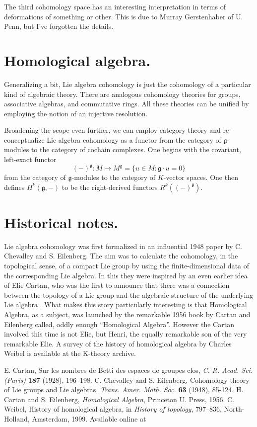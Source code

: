 \documentclass[12pt]{article}
\newcommand{\fg}{\mathfrak{g}}
\begin{document}
The third cohomology space has an interesting interpretation in terms
of deformations of something or other.  This is due to Murray
Gerstenhaber of U. Penn, but I've forgotten the details.

\section{Homological algebra.}
Generalizing a bit, Lie algebra cohomology is just the cohomology of a
particular kind of algebraic theory.  There are analogous cohomology
theories for groups, associative algebras, and commutative rings.  All
these theories can be unified by employing the notion of an injective
resolution.

Broadening the scope even further, we can employ category theory and
re-conceptualize Lie algebra cohomology as a functor from the category
of $\fg$-modules to the category of cochain complexes.  One begins with
the covariant, left-exact functor
\[ (-)^\fg: M\mapsto M^{\fg}=\{u\in M : \fg \cdot u=0 \}\] from
the category of $\fg$-modules to the category of $K$-vector spaces.
One then defines $H^k(\fg,-)$ to be the right-derived functors
$R^k((-)^{\fg})$.

\section{Historical notes.}
Lie algebra cohomology was first formalized in an influential 1948
paper by C. Chevalley and S. Eilenberg\cite{CE48}.  The aim was to
calculate the cohomology, in the topological sense, of a compact Lie
group by using the finite-dimensional data of the corresponding Lie
algebra.  In this they were inspired by an even earlier idea of Elie
Cartan, who was the first to announce that there was a connection
between the topology of a Lie group and the algebraic structure of the
underlying Lie algebra \cite{C28}.  What makes this story particularly
interesting is that Homological Algebra, as a subject, was launched by
the remarkable 1956 book\cite{CE56} by Cartan and Eilenberg called,
oddly enough ``Homological Algebra''.  However the Cartan involved
this time is not Elie, but Henri, the equally remarkable son of the
very remarkable Elie.  A survey of the history of homological algebra
by Charles Weibel is available at the K-theory archive\cite{CW99}.
\begin{thebibliography}{99}
 E. Cartan, Sur les nombres de Betti des espaces de
  groupes clos, \textit{C. R. Acad. Sci. (Paris)} \textbf{187} (1928),
  196--198.
 C. Chevalley and S. Eilenberg, Cohomology theory of Lie
  groups and Lie algebras, \textit{Trans. Amer. Math. Soc.} \textbf{63}
  (1948), 85-124.
H. Cartan and S. Eilenberg, \textit{Homological
    Algebra}, Princeton U. Press, 1956.
 C. Weibel, History of homological algebra, in
  \textit{History of topology}, 797--836, North-Holland, Amsterdam,
  1999. Available online at
\end{thebibliography}
\end{document}
